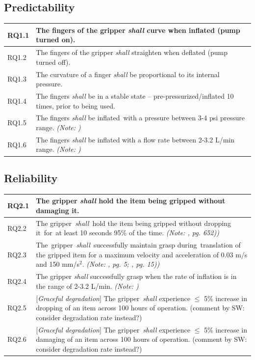 \documentclass[lettersize,journal]{IEEEtran}
\begin{document}
\subsection{Predictability}\label{predictability}
\begin{center}
	\begin{tabular}{|p{7mm}|p{72mm}|}
		\hline
		RQ1.1 & The fingers of the gripper \emph{shall} curve when inflated (pump turned on).  \\ 
		\hline
		RQ1.2 & The fingers of the gripper \emph{shall} straighten when deflated (pump turned off).  \\ 
		\hline
		RQ1.3 & The curvature of a finger \emph{shall} be proportional to its internal pressure. \\
		\hline
		RQ1.4 & The fingers \emph{shall} be in a stable state -- pre-pressurized/inflated 10 times, prior to being used. \\ 
		\hline
		RQ1.5 & The fingers \emph{shall} be inflated with a pressure between 3-4 psi pressure range. \emph{(Note: \cite{Partridge2022})} \\
		\hline
		RQ1.6 & The fingers \emph{shall} be inflated with a flow rate between 2-3.2 L/min range. \emph{(Note: \cite{DEWIN2022})} \\	[1ex] 		
		\hline
	\end{tabular}
\end{center}

\subsection{Reliability}\label{reliability}
\begin{center}
	\begin{tabular}{|p{7mm}|p{72mm}|}
		\hline
		RQ2.1 & The gripper \emph{shall} hold the item being gripped without damaging it.  \\ 
		\hline
		RQ2.2 & The gripper \emph{shall} hold the item being gripped without dropping it for at least 10 seconds 95\% of the time.  \emph{(Note: \cite{Sotiropoulos2018}, pg. 652))}\\ 
		\hline
		RQ2.3 & The gripper \emph{shall} successfully maintain grasp during translation of the gripped item for a maximum velocity and acceleration of 0.03 m/s and 150 mm/s$^2$. \emph{(Note: \cite{Triantafyllou2019}, pg. 5; \cite{Cheng2021}, pg. 15))}\\
		\hline
		RQ2.4& The gripper \emph{shall} successfully grasp when the rate of inflation is in the range of 2-3.2 L/min. \emph{(Note: \cite{DEWIN2022})}\\
		\hline
		RQ2.5 & [\emph{Graceful degradation}] The gripper \emph{shall} experience $\le$ 5\% increase in dropping of an item across 100 hours of operation. (comment by SW: consider degradation rate instead?) \\			\hline	
		RQ2.6 & [\emph{Graceful degradation}] The gripper \emph{shall} experience $\le$ 5\% increase in damaging of an item across 100 hours of operation.  (comment by SW: consider degradation rate instead?) \\		[1ex] 		
		\hline
	\end{tabular}
\end{center}
\end{document}
